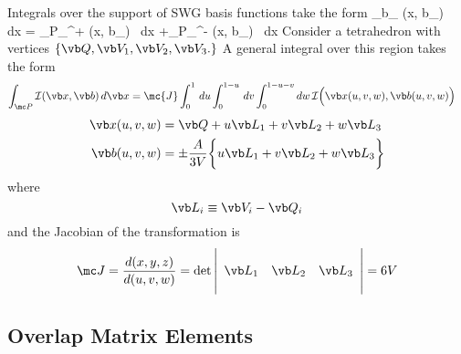 \documentclass[letterpaper]{article}
\begin{document}
Integrals over the support of SWG basis functions take the form
{
 \int_{\sup \vb b_\alpha} (\vb x, \vb b_\alpha) \, d\vb x
= 
  \int_{\mc P_\alpha^+} (\vb x, \vb b_\alpha) \, d\vb x
 +\int_{\mc P_\alpha^-} (\vb x, \vb b_\alpha) \, d\vb x
}
Consider a tetrahedron with vertices 
$\{\vb Q, \vb V_1, \vb V_2, \vb V_3.\}$ 
A general
integral over this region takes the form 
\begin{align*}
 \int_{\mc P} \mathcal{I}(\vb x, \vb b ) \, d\vb x
&=\mc{J} \int_0^1 \, du \int_0^{1-u} \, dv \int_0^{1-u-v} dw \,
  \mathcal{I}\Big( \vb x(u,v,w), \vb b(u,v,w) \Big)
\end{align*}
\begin{align*}
 \vb x(u,v,w) 
&= 
 \vb Q + u\vb L_1 + v\vb L_2 + w\vb L_3 
\\
 \vb b(u,v,w) 
&= 
 \pm \frac{A}{3V}\bigg\{ u \vb L_1 
                        +v \vb L_2 
                        +w \vb L_3 
                 \bigg\}
\end{align*}
where
$$ \vb L_i \equiv \vb V_i - \vb Q_i $$
and the Jacobian of the transformation is 
$$\mc J=\frac{d(x,y,z)}{d(u,v,w)}
   =\det\left|\begin{array}{ccc} 
     \\
     \vb L_1 & \vb L_2 & \vb L_3 \\
     \\
     \end{array}\right|
  =6V
$$

\subsection*{Overlap Matrix Elements} 
\end{document}
